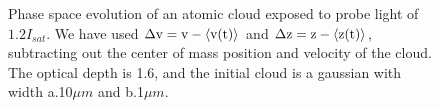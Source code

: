 \documentclass[12pt]{iopart}
\begin{document}
\begin{figure}
\caption{Phase space evolution of an atomic cloud exposed to probe light of $1.2 I_{sat}$. We have used $\Delta \rm{v}=\rm{v} -\left< \rm{v}(t) \right>$  and $\Delta \rm{z}=\rm{z}-\left< \rm{z}(t) \right>$, subtracting out the center of mass position and velocity of the cloud. The optical depth is 1.6, and the initial cloud is a gaussian with width a.10$\mu m$ and b.1$\mu m$.}  
\label{fig:phaseSpace}
\end{figure}
\end{document}
